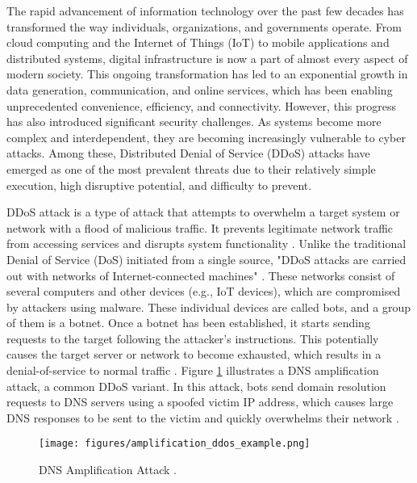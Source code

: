 The rapid advancement of information technology over the past few decades has transformed the way individuals, organizations, and governments operate. From cloud computing and the Internet of Things (IoT) to mobile applications and distributed systems, digital infrastructure is now a part of almost every aspect of modern society. This ongoing transformation has led to an exponential growth in data generation, communication, and online services, which has been enabling unprecedented convenience, efficiency, and connectivity. However, this progress has also introduced significant security challenges. As systems become more complex and interdependent, they are becoming increasingly vulnerable to cyber attacks. Among these, Distributed Denial of Service (DDoS) attacks have emerged as one of the most prevalent threats due to their relatively simple execution, high disruptive potential, and difficulty to prevent.

DDoS attack is a type of attack that attempts to overwhelm a target system or network with a flood of malicious traffic. It prevents legitimate network traffic from accessing services and disrupts system functionality \citep{886455}. Unlike the traditional Denial of Service (DoS) initiated from a single source, "DDoS attacks are carried out with networks of Internet-connected machines" \citep{cloudflare-ddos-attack}. These networks consist of several computers and other devices (e.g., IoT devices), which are compromised by attackers using malware. These individual devices are called bots, and a group of them is a botnet. Once a botnet has been established, it starts sending requests to the target following the attacker's instructions. This potentially causes the target server or network to become exhausted, which results in a denial-of-service to normal traffic \citep{cloudflare-ddos-attack}. Figure \ref{fig:amplification_ddos_example} illustrates a DNS amplification attack, a common DDoS variant. In this attack, bots send domain resolution requests to DNS servers using a spoofed victim IP address, which causes large DNS responses to be sent to the victim and quickly overwhelms their network \citep{cloudflare-ddos-attack}.

\begin{figure}[h]
    \centering
    \texttt{[image: figures/amplification\_ddos\_example.png]}
    \caption{DNS Amplification Attack \citep{cloudflare-ddos-attack}.}
    \label{fig:amplification_ddos_example}
\end{figure}

